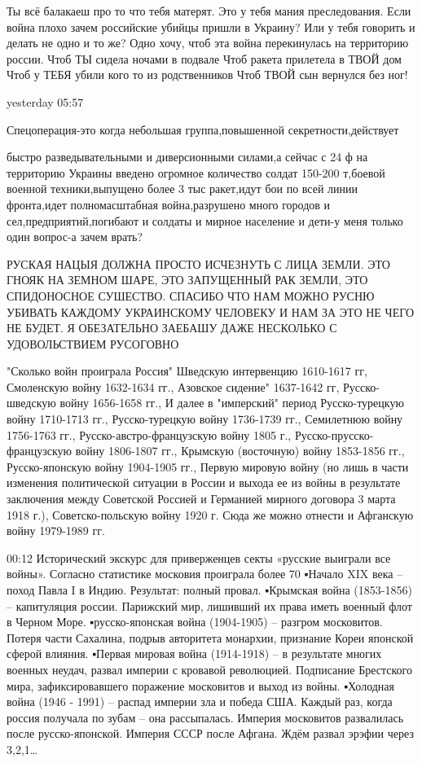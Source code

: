 {%

Ты всё балакаеш про то что тебя матерят.
Это у тебя мания преследования.
Если война плохо зачем российские убийцы пришли в Украину?
Или у тебя говорить и делать не одно и то же?
Одно хочу, чтоб эта война перекинулась на территорию россии. Чтоб ТЫ сидела ночами в подвале
Чтоб ракета прилетела в ТВОЙ дом
Чтоб у ТЕБЯ убили кого то из родственников
Чтоб ТВОЙ сын вернулся без ног!

yesterday 05:57

Спецоперация-это когда небольшая группа,повышенной секретности,действует

быстро разведывательными и диверсионными силами,а сейчас с 24 ф на территорию
Украины введено огромное количество солдат 150-200 т,боевой военной
техники,выпущено более 3 тыс ракет,идут бои по всей линии фронта,идет
полномасштабная война,разрушено много городов и сел,предприятий,погибают и
солдаты и мирное население и дети-у меня только один вопрос-а зачем врать? 

РУСКАЯ НАЦЫЯ ДОЛЖНА ПРОСТО ИСЧЕЗНУТЬ С ЛИЦА ЗЕМЛИ. ЭТО ГНОЯК НА ЗЕМНОМ ШАРЕ,
ЭТО ЗАПУЩЕННЫЙ РАК ЗЕМЛИ, ЭТО СПИДОНОСНОЕ СУШЕСТВО. СПАСИБО ЧТО НАМ МОЖНО РУСНЮ
УБИВАТЬ КАЖДОМУ УКРАИНСКОМУ ЧЕЛОВЕКУ И НАМ ЗА ЭТО НЕ ЧЕГО НЕ БУДЕТ. Я
ОБЕЗАТЕЛЬНО ЗАЕБАШУ ДАЖЕ НЕСКОЛЬКО С УДОВОЛЬСТВИЕМ РУСОГОВНО

"Сколько войн проиграла Россия"
Шведскую интервенцию 1610-1617 гг,
Смоленскую войну 1632-1634 гг.,
Азовское сидение" 1637-1642 гг,
Русско-шведскую войну 1656-1658 гг.,
И далее в "имперский" период
Русско-турецкую войну 1710-1713 гг.,
Русско-турецкую войну 1736-1739 гг.,
Семилетнюю войну 1756-1763 гг.,
Русско-австро-французскую войну 1805 г.,
Русско-прусско-французскую войну 1806-1807 гг.,
Крымскую (восточную) войну 1853-1856 гг.,
Русско-японскую войну 1904-1905 гг.,
Первую мировую войну (но лишь в части изменения политической ситуации в России и выхода ее из войны в результате заключения между Советской Россией и Германией мирного договора 3 марта 1918 г.),
Советско-польскую войну 1920 г.
Сюда же можно отнести и Афганскую войну 1979-1989 гг.

00:12
Исторический экскурс для приверженцев секты «русские выиграли все войны».
Согласно статистике московия проиграла более 70%
▪️Начало XIX века – поход Павла I в Индию. Результат: полный провал.
▪️Крымская война (1853-1856) – капитуляция россии. Парижский мир, лишивший их права иметь военный флот в Черном Море.
▪️русско-японская война (1904-1905) – разгром московитов. Потеря части Сахалина, подрыв авторитета монархии, признание Кореи японской сферой влияния.
▪️Первая мировая война (1914-1918) – в результате многих военных неудач, развал империи с кровавой революцией. Подписание Брестского мира, зафиксировавшего поражение московитов и выход из войны.
▪️Холодная война (1946 - 1991) – распад империи зла и победа США.
Каждый раз, когда россия получала по зубам – она рассыпалась.
Империя московитов развалилась после русско-японской. Империя СССР после Афгана.
Ждём развал эрэфии через 3,2,1…

}
